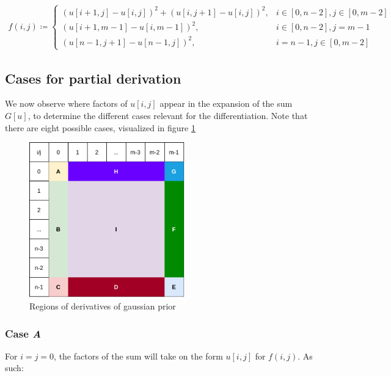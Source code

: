 \documentclass[a4paper]{scrreprt}
\begin{document}
\begin{align*}
		f(i, j) \coloneqq 
		\begin{cases}
				(u[i + 1, j] - u[i, j])^2 + (u[i, j + 1] - u[i, j])^2, & i \in [0, n - 2], j \in [0, m - 2] \\
				(u[i + 1, m - 1] - u[i, m - 1])^2, & i \in [0, n - 2], j = m - 1 \\
				(u[n - 1, j + 1] - u[n - 1, j])^2, & i = n - 1, j \in [0, m - 2]
		\end{cases}
\end{align*}

\subsection{Cases for partial derivation}

We now observe where factors of $u[i, j]$ appear in the expansion of the sum
$G[u]$, to determine the different cases relevant for the differentiation. Note
that there are eight possible cases, visualized in figure
\ref{fig:gaussian_prior_derivatives}

\begin{figure}
		\centering
		\includegraphics[width=0.6\textwidth]{resources/gaussian_prior_derivatives.png}
		\caption{Regions of derivatives of gaussian prior}
		\label{fig:gaussian_prior_derivatives}
\end{figure}


\subsubsection{Case \emph{A}}

For $i = j = 0$, the factors of the sum will take on the form $u[i, j]$ for
$f(i, j)$. As such:
\end{document}
